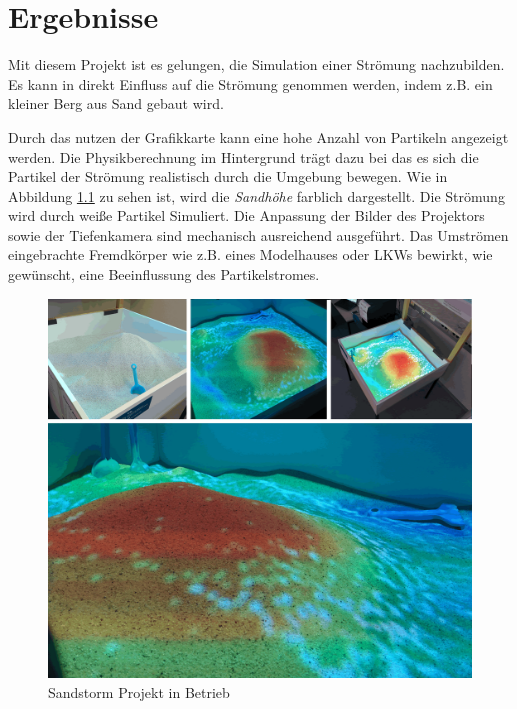 \chapter{Ergebnisse}
\begin{Spacing}{\mylinespace}

Mit diesem Projekt ist es gelungen, die Simulation einer Strömung nachzubilden. Es kann in direkt Einfluss auf die Strömung genommen werden, indem z.B. ein kleiner Berg aus Sand gebaut wird.

Durch das nutzen der Grafikkarte kann eine hohe Anzahl von Partikeln angezeigt werden. Die Physikberechnung im Hintergrund trägt dazu bei das es sich die Partikel der Strömung realistisch durch die Umgebung bewegen. Wie in Abbildung \ref{fig:Results} zu sehen ist, wird die \textit{Sandhöhe} farblich dargestellt. Die Strömung wird durch weiße Partikel Simuliert. Die Anpassung der Bilder des Projektors sowie der Tiefenkamera sind mechanisch ausreichend ausgeführt. Das Umströmen eingebrachte Fremdkörper wie z.B. eines Modelhauses oder LKWs bewirkt, wie gewünscht, eine Beeinflussung des Partikelstromes. 

\begin{figure}[h!]
	\vspace*{30px}
	\includegraphics[width=\textwidth]{graphics/results.png}	
	\caption{Sandstorm Projekt in Betrieb}
	\label{fig:Results}
\end{figure}

\end{Spacing}
\newpage
\clearpage

